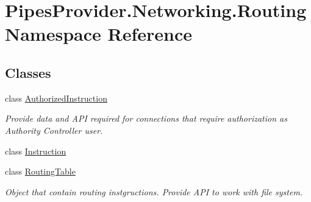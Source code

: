 \hypertarget{namespace_pipes_provider_1_1_networking_1_1_routing}{}\section{Pipes\+Provider.\+Networking.\+Routing Namespace Reference}
\label{namespace_pipes_provider_1_1_networking_1_1_routing}
\subsection*{Classes}
\begin{DoxyCompactItemize}
\item 
class \mbox{\hyperlink{class_pipes_provider_1_1_networking_1_1_routing_1_1_authorized_instruction}{Authorized\+Instruction}}
\begin{DoxyCompactList}\small\item\em Provide data and A\+PI required for connections that require authorization as Authority Controller user. \end{DoxyCompactList}\item 
class \mbox{\hyperlink{class_pipes_provider_1_1_networking_1_1_routing_1_1_instruction}{Instruction}}
\item 
class \mbox{\hyperlink{class_pipes_provider_1_1_networking_1_1_routing_1_1_routing_table}{Routing\+Table}}
\begin{DoxyCompactList}\small\item\em Object that contain routing instgructions. Provide A\+PI to work with file system. \end{DoxyCompactList}\end{DoxyCompactItemize}
